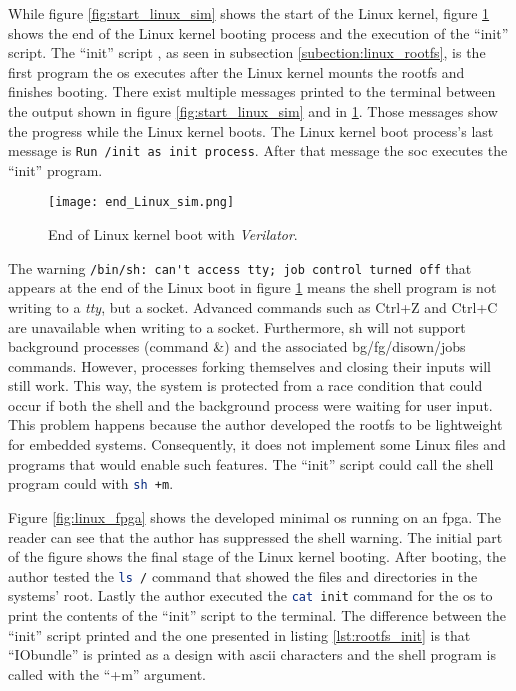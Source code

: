 While figure \ref{fig:start_linux_sim} shows the start of the Linux kernel, figure \ref{fig:end_linux_verilator} shows the end of the Linux kernel booting process and the execution of the \enquote{init} script. The \enquote{init} script , as seen in subsection \ref{subection:linux_rootfs}, is the first program the \acrshort{os} executes after the Linux kernel mounts the \acrshort{rootfs} and finishes booting. There exist multiple messages printed to the terminal between the output shown in figure \ref{fig:start_linux_sim} and in \ref{fig:end_linux_verilator}. Those messages show the progress while the Linux kernel boots. The Linux kernel boot process's last message is \lstinline{Run /init as init process}. After that message the \acrshort{soc} executes the \enquote{init} program.

\begin{figure}[!ht]
    \centering
    \texttt{[image: end\_Linux\_sim.png]}
    \caption{End of Linux kernel boot with \textit{Verilator}.}
    \label{fig:end_linux_verilator}
\end{figure}

The warning \lstinline{/bin/sh: can't access tty; job control turned off} that appears at the end of the Linux boot in figure \ref{fig:end_linux_verilator} means the shell program is not writing to a \textit{tty}, but a socket. Advanced commands such as Ctrl+Z and Ctrl+C are unavailable when writing to a socket. Furthermore, sh will not support background processes (command \&) and the associated bg/fg/disown/jobs commands. However, processes forking themselves and closing their inputs will still work. This way, the system is protected from a race condition that could occur if both the shell and the background process were waiting for user input. This problem happens because the author developed the \acrshort{rootfs} to be lightweight for embedded systems. Consequently, it does not implement some Linux files and programs that would enable such features. The \enquote{init} script could call the shell program could with \lstinline[language=sh]{sh +m}.

Figure \ref{fig:linux_fpga} shows the developed minimal \acrshort{os} running on an \acrshort{fpga}. The reader can see that the author has suppressed the shell warning. The initial part of the figure shows the final stage of the Linux kernel booting. After booting, the author tested the \lstinline[language=sh]{ls /} command that showed the files and directories in the systems' root. Lastly the author executed the \lstinline[language=sh]{cat init} command for the \acrshort{os} to print the contents of the \enquote{init} script to the terminal. The difference between the \enquote{init} script printed and the one presented in listing \ref{lst:rootfs_init} is that \enquote{IObundle} is printed as a design with \acrshort{ascii} characters and the shell program is called with the \enquote{+m} argument.

